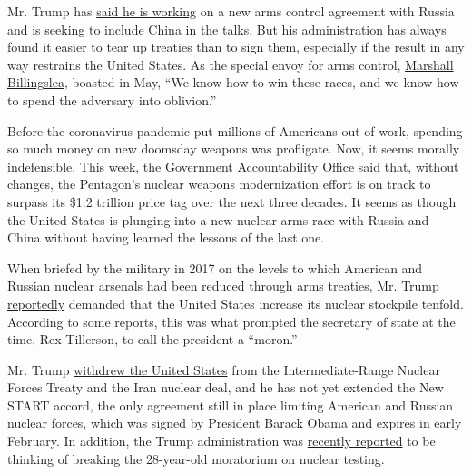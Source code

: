 Mr. Trump has
\href{https://foreignpolicy.com/2020/07/23/trump-china-russia-new-arms-control-agreement-start/}{said
he is working} on a new arms control agreement with Russia and is
seeking to include China in the talks. But his administration has always
found it easier to tear up treaties than to sign them, especially if the
result in any way restrains the United States. As the special envoy for
arms control,
\href{https://www.reuters.com/article/uk-usa-armscontrol/u-s-prepared-to-spend-russia-china-into-oblivion-to-win-nuclear-arms-race-u-s-envoy-idUSKBN22X2LS}{Marshall
Billingslea}, boasted in May, ``We know how to win these races, and we
know how to spend the adversary into oblivion.''

Before the coronavirus pandemic put millions of Americans out of work,
spending so much money on new doomsday weapons was profligate. Now, it
seems morally indefensible. This week, the
\href{https://homelandprepnews.com/stories/53270-report-examines-nuclear-weapons-modernization-costs/}{Government
Accountability Office} said that, without changes, the Pentagon's
nuclear weapons modernization effort is on track to surpass its \$1.2
trillion price tag over the next three decades. It seems as though the
United States is plunging into a new nuclear arms race with Russia and
China without having learned the lessons of the last one.

When briefed by the military in 2017 on the levels to which American and
Russian nuclear arsenals had been reduced through arms treaties, Mr.
Trump
\href{https://www.cnbc.com/2017/10/11/trump-reportedly-wanted-nearly-10-times-more-nuclear-weapons.html}{reportedly}
demanded that the United States increase its nuclear stockpile tenfold.
According to some reports, this was what prompted the secretary of state
at the time, Rex Tillerson, to call the president a ``moron.''

Mr. Trump
\href{https://www.nytimes.com/2019/02/01/us/politics/trump-inf-nuclear-treaty.html}{withdrew
the United States} from the Intermediate-Range Nuclear Forces Treaty and
the Iran nuclear deal, and he has not yet extended the New START accord,
the only agreement still in place limiting American and Russian nuclear
forces, which was signed by President Barack Obama and expires in early
February. In addition, the Trump administration was
\href{https://www.cnn.com/2020/06/24/politics/trump-administration-nuclear-test/index.html}{recently
reported} to be thinking of breaking the 28-year-old moratorium on
nuclear testing.

